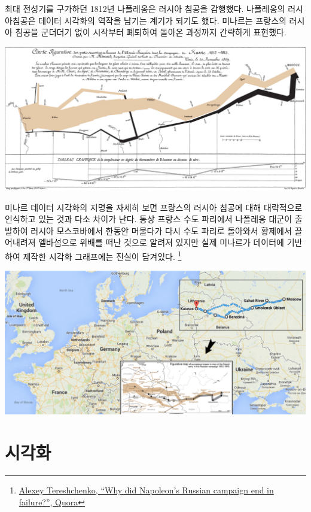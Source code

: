 \documentclass[
]{book}
\begin{document}
최대 전성기를 구가하던 1812년 나폴레옹은 러시아 침공을 감행했다. 나폴레옹의
러시아침공은 데이터 시각화의 역작을 남기는 계기가 되기도 했다.
미나르는 프랑스의 러시아 침공을 군더더기 없이 시작부터 폐퇴하여 돌아온 과정까지 간략하게 표현했다.

\includegraphics[width=1\textwidth,height=\textheight]{assets/images/Minard.png}

미나르 데이터 시각화의 지명을 자세히 보면 프랑스의 러시아 침공에 대해 대략적으로
인식하고 있는 것과 다소 차이가 난다. 통상 프랑스 수도 파리에서 나폴레옹 대군이
출발하여 러시아 모스코바에서 한동안 머물다가 다시 수도 파리로 돌아와서 황제에서
끌어내려져 엘바섬으로 위배를 떠난 것으로 알려져 있지만 실제 미나르가 데이터에
기반하여 제작한 시각화 그래프에는 진실이 담겨있다. \footnote{\href{https://theeducationalblog.quora.com/Why-did-Napoleon-s-Russian-campaign-end-in-failure-http-www-ryin-main-quora-com-Why-did-Napoleon-s-Russian-campaign}{Alexey Tereshchenko, ``Why did Napoleon's Russian campaign end in failure?'', Quora}}

\includegraphics[width=1\textwidth,height=\textheight]{assets/images/minard-actual-map.png}

\hypertarget{napoleon-viz}{%
\section{시각화}\label{napoleon-viz}}
\end{document}
